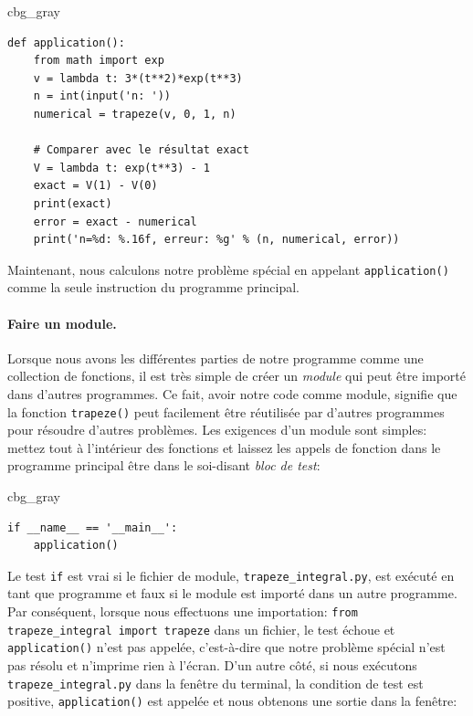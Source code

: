 \documentclass[%
oneside,                 %
final,                   %
10pt]{article}
\newenvironment{_cod_tight}[1]{
   \def\FrameCommand{\colorbox{#1}}
   \FrameRule0.6pt\MakeFramed {\FrameRestore}\vskip3mm}
   {\vskip0mm\endMakeFramed}
\newenvironment{cod}[1]{
\bgroup\rmfamily
\fboxsep=0mm\relax
\begin{_cod_tight}{#1}
\list{}{\parsep=-2mm\parskip=0mm\topsep=0pt\leftmargin=2mm
\rightmargin=2\leftmargin\leftmargin=4pt\relax}
\item\relax}
{\endlist\end{_cod_tight}\egroup}
\begin{document}
\begin{cod}{cbg_gray}\begin{verbatim}
def application():
    from math import exp
    v = lambda t: 3*(t**2)*exp(t**3)
    n = int(input('n: '))
    numerical = trapeze(v, 0, 1, n)

    # Comparer avec le résultat exact
    V = lambda t: exp(t**3) - 1
    exact = V(1) - V(0)
    print(exact)
    error = exact - numerical
    print('n=%d: %.16f, erreur: %g' % (n, numerical, error))
\end{verbatim}
\end{cod}
\noindent

Maintenant, nous calculons notre problème spécial en appelant \texttt{application()} comme la seule instruction du programme principal.

\paragraph{Faire un module.}
Lorsque nous avons les différentes parties de notre programme comme une collection de fonctions, il est très simple de créer un \emph{module} qui peut être importé dans d'autres programmes. Ce fait, avoir notre code comme module, signifie que la fonction \texttt{trapeze()} peut facilement être réutilisée par d'autres programmes pour résoudre d'autres problèmes. Les exigences d'un module sont simples: mettez tout à l'intérieur des fonctions et laissez les appels de fonction dans le programme principal être dans le soi-disant \emph{bloc de test}:
\begin{cod}{cbg_gray}\begin{verbatim}
if __name__ == '__main__':
    application()
\end{verbatim}
\end{cod}
\noindent

Le test \texttt{if} est vrai si le fichier de module, \Verb!trapeze_integral.py!, est exécuté en tant que programme et faux si le module est importé dans un autre programme. Par conséquent, lorsque nous effectuons une importation: \Verb!from trapeze_integral import trapeze! dans un fichier, le test échoue et \texttt{application()} n'est pas appelée, c'est-à-dire que notre problème spécial n'est pas résolu et n'imprime rien à l'écran. D'un autre côté, si nous exécutons \Verb!trapeze_integral.py! dans la fenêtre du terminal, la condition de test est positive, \texttt{application()} est appelée et nous obtenons une sortie dans la fenêtre:
\end{document}
